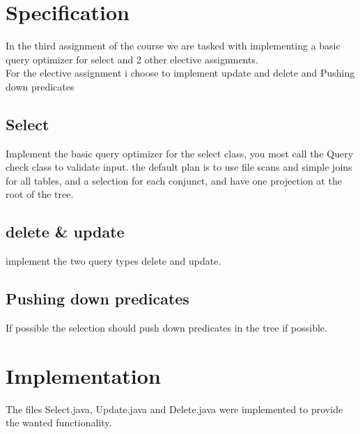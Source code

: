 \documentclass[a4paper,10pt,titlepage]{report}
\begin{document}
\section{Specification}
In the third assignment of the course we are tasked with implementing a basic query optimizer for select and 2 other elective assignments.\\

For the elective assignment i choose to implement update and delete and Pushing down predicates \\


\subsection{Select}
Implement the basic query optimizer for the select class, you most call the Query check class to validate input. the default plan is to use file scans and simple joins for all tables, and a selection for each conjunct, and have one projection at the root of the tree.

\subsection{delete \& update }

implement the two query types delete and update.

\subsection{Pushing down predicates}
If possible the selection should push down predicates in the tree if possible.



%

\section{Implementation}
The files \textsf{Select.java}, \textsf{Update.java} and \textsf{Delete.java} were implemented to provide the wanted functionality.
\end{document}
